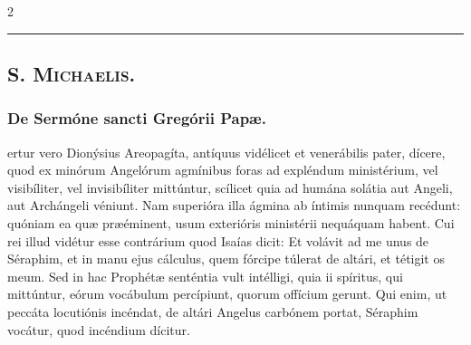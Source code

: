\documentclass[9pt,twoside]{extarticle}
\begin{document}
\begin{multicols}{2}
\begin{tightlist}{}
\item {}
\end{tightlist}

\begin{center}\textcolor{red}{\rule{\linewidth}{0.5pt}} \end{center}

\subsection*{\center \textsc{}}
\subsubsection*{\center {}}
\subsection*{\center \textsc{S. Michaelis.}}
\subsubsection*{\center {}}

\subsubsection*{\center De Sermóne sancti Gregórii Papæ.}
\begin{center}\end{center}
ertur vero Dionýsius Areopagíta, antíquus vidélicet et venerábilis pater, dícere, quod ex minórum Angelórum agmínibus foras ad expléndum ministérium, vel visibíliter, vel invisibíliter mittúntur, scílicet quia ad humána solátia aut Angeli, aut Archángeli véniunt. Nam superióra illa ágmina ab íntimis nunquam recédunt: quóniam ea quæ præéminent, usum exterióris ministérii nequáquam habent. Cui rei illud vidétur esse contrárium quod Isaías dicit: Et volávit ad me unus de Séraphim, et in manu ejus cálculus, quem fórcipe túlerat de altári, et tétigit os meum. Sed in hac Prophétæ senténtia vult intélligi, quia ii spíritus, qui mittúntur, eórum vocábulum percípiunt, quorum offícium gerunt. Qui enim, ut peccáta locutiónis incéndat, de altári Angelus carbónem portat, Séraphim vocátur, quod incéndium dícitur.


\end{multicols}
\end{document}
